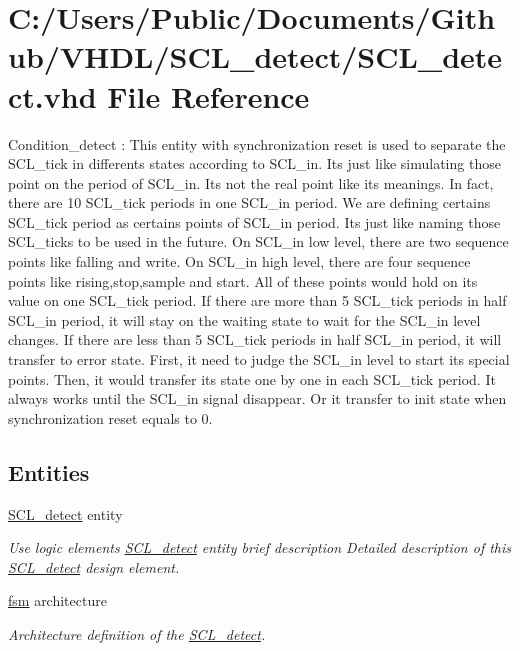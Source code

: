 \hypertarget{_s_c_l__detect_8vhd}{}\section{C\+:/\+Users/\+Public/\+Documents/\+Github/\+V\+H\+D\+L/\+S\+C\+L\+\_\+detect/\+S\+C\+L\+\_\+detect.vhd File Reference}
\label{_s_c_l__detect_8vhd}


Condition\+\_\+detect \+: This entity with synchronization reset is used to separate the S\+C\+L\+\_\+tick in differents states according to S\+C\+L\+\_\+in. It\textquotesingle{}s just like simulating those point on the period of S\+C\+L\+\_\+in. It\textquotesingle{}s not the real point like its meanings. In fact, there are 10 S\+C\+L\+\_\+tick periods in one S\+C\+L\+\_\+in period. We are defining certains S\+C\+L\+\_\+tick period as certains points of S\+C\+L\+\_\+in period. It\textquotesingle{}s just like naming those S\+C\+L\+\_\+ticks to be used in the future. On S\+C\+L\+\_\+in low level, there are two sequence points like falling and write. On S\+C\+L\+\_\+in high level, there are four sequence points like rising,stop,sample and start. All of these points would hold on its value on one S\+C\+L\+\_\+tick period. If there are more than 5 S\+C\+L\+\_\+tick periods in half S\+C\+L\+\_\+in period, it will stay on the waiting state to wait for the S\+C\+L\+\_\+in level changes. If there are less than 5 S\+C\+L\+\_\+tick periods in half S\+C\+L\+\_\+in period, it will transfer to error state. First, it need to judge the S\+C\+L\+\_\+in level to start its special points. Then, it would transfer its state one by one in each S\+C\+L\+\_\+tick period. It always works until the S\+C\+L\+\_\+in signal disappear. Or it transfer to init state when synchronization reset equals to \textquotesingle{}0\textquotesingle{}.  


\subsection*{Entities}
\begin{DoxyCompactItemize}
\item 
\hyperlink{class_s_c_l__detect}{S\+C\+L\+\_\+detect} entity
\begin{DoxyCompactList}\small\item\em Use logic elements \hyperlink{class_s_c_l__detect}{S\+C\+L\+\_\+detect} entity brief description Detailed description of this \hyperlink{class_s_c_l__detect}{S\+C\+L\+\_\+detect} design element. \end{DoxyCompactList}\item 
\hyperlink{class_s_c_l__detect_1_1fsm}{fsm} architecture
\begin{DoxyCompactList}\small\item\em Architecture definition of the \hyperlink{class_s_c_l__detect}{S\+C\+L\+\_\+detect}. \end{DoxyCompactList}\end{DoxyCompactItemize}


